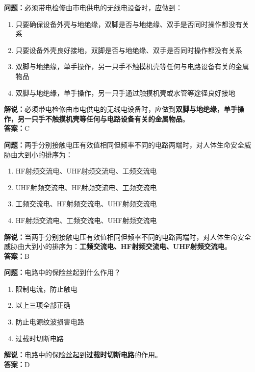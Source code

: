 \documentclass{ctexbook}
\begin{document}
\bigskip


\noindent\textbf{问题：}必须带电检修由市电供电的无线电设备时，应做到：
\begin{enumerate}[label=\Alph*), leftmargin=3em]
	\item 只要确保设备外壳与地绝缘，双脚是否与地绝缘、双手是否同时操作都没有关系
	\item 只要设备外壳良好接地，双脚是否与地绝缘、双手是否同时操作都没有关系
	\item 双脚与地绝缘，单手操作，另一只手不触摸机壳等任何与电路设备有关的金属物品
	\item 双脚与地绝缘，单手操作，另一只手通过触摸机壳或水管等途径良好接地
\end{enumerate}
\noindent\textbf{解说：}必须带电检修由市电供电的无线电设备时，应做到\textbf{双脚与地绝缘，单手操作，另一只手不触摸机壳等任何与电路设备有关的金属物品}。\\\noindent\textbf{答案：}C
\bigskip


\noindent\textbf{问题：}两手分别接触电压有效值相同但频率不同的电路两端时，对人体生命安全威胁由大到小的排序为：
\begin{enumerate}[label=\Alph*), leftmargin=3em]
	\item HF射频交流电、UHF射频交流电、工频交流电
	\item UHF射频交流电、HF射频交流电、工频交流电
	\item 工频交流电、HF射频交流电、UHF射频交流电
	\item HF射频交流电、工频交流电、UHF射频交流电
\end{enumerate}
\noindent\textbf{解说：}当两手分别接触电压有效值相同但频率不同的电路两端时，对人体生命安全威胁由大到小的排序为：\textbf{工频交流电、HF射频交流电、UHF射频交流电}。\\\noindent\textbf{答案：}B%

\bigskip


\noindent\textbf{问题：}电路中的保险丝起到什么作用？
\begin{enumerate}[label=\Alph*), leftmargin=3em]
	\item 限制电流，防止触电
	\item 以上三项全部正确
	\item 防止电源纹波损害电路
	\item 过载时切断电路
\end{enumerate}
\noindent\textbf{解说：}电路中的保险丝起到\textbf{过载时切断电路}的作用。\\\noindent\textbf{答案：}D
\bigskip
\end{document}
